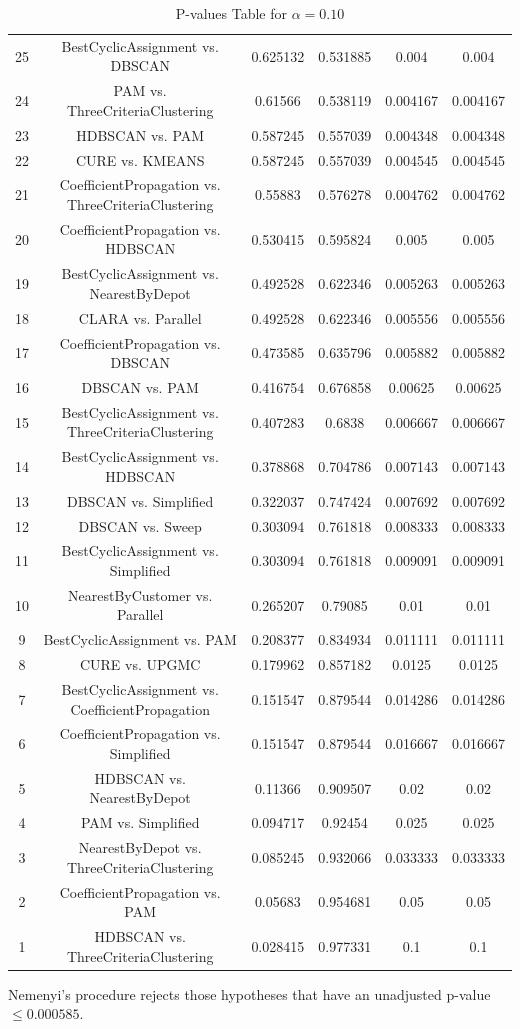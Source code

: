 \documentclass[a4paper,10pt]{article}
\begin{document}
\begin{landscape}
\begin{table}[!htp]
\begin{tabular}{cccccc}
25&BestCyclicAssignment vs. DBSCAN&0.625132&0.531885&0.004&0.004\\
24&PAM vs. ThreeCriteriaClustering&0.61566&0.538119&0.004167&0.004167\\
23&HDBSCAN vs. PAM&0.587245&0.557039&0.004348&0.004348\\
22&CURE vs. KMEANS&0.587245&0.557039&0.004545&0.004545\\
21&CoefficientPropagation vs. ThreeCriteriaClustering&0.55883&0.576278&0.004762&0.004762\\
20&CoefficientPropagation vs. HDBSCAN&0.530415&0.595824&0.005&0.005\\
19&BestCyclicAssignment vs. NearestByDepot&0.492528&0.622346&0.005263&0.005263\\
18&CLARA vs. Parallel&0.492528&0.622346&0.005556&0.005556\\
17&CoefficientPropagation vs. DBSCAN&0.473585&0.635796&0.005882&0.005882\\
16&DBSCAN vs. PAM&0.416754&0.676858&0.00625&0.00625\\
15&BestCyclicAssignment vs. ThreeCriteriaClustering&0.407283&0.6838&0.006667&0.006667\\
14&BestCyclicAssignment vs. HDBSCAN&0.378868&0.704786&0.007143&0.007143\\
13&DBSCAN vs. Simplified&0.322037&0.747424&0.007692&0.007692\\
12&DBSCAN vs. Sweep&0.303094&0.761818&0.008333&0.008333\\
11&BestCyclicAssignment vs. Simplified&0.303094&0.761818&0.009091&0.009091\\
10&NearestByCustomer vs. Parallel&0.265207&0.79085&0.01&0.01\\
9&BestCyclicAssignment vs. PAM&0.208377&0.834934&0.011111&0.011111\\
8&CURE vs. UPGMC&0.179962&0.857182&0.0125&0.0125\\
7&BestCyclicAssignment vs. CoefficientPropagation&0.151547&0.879544&0.014286&0.014286\\
6&CoefficientPropagation vs. Simplified&0.151547&0.879544&0.016667&0.016667\\
5&HDBSCAN vs. NearestByDepot&0.11366&0.909507&0.02&0.02\\
4&PAM vs. Simplified&0.094717&0.92454&0.025&0.025\\
3&NearestByDepot vs. ThreeCriteriaClustering&0.085245&0.932066&0.033333&0.033333\\
2&CoefficientPropagation vs. PAM&0.05683&0.954681&0.05&0.05\\
1&HDBSCAN vs. ThreeCriteriaClustering&0.028415&0.977331&0.1&0.1\\
\hline
\end{tabular}
\caption{P-values Table for $\alpha=0.10$}
\end{table}Nemenyi's procedure rejects those hypotheses that have an unadjusted p-value $\le0.000585$.


\end{landscape}
\end{document}
